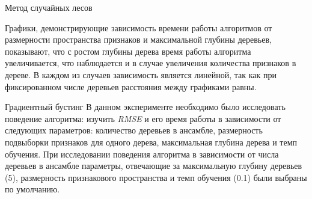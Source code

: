 \documentclass[12pt]{article}
\begin{document}
\begin{section}{Метод случайных лесов}
\newpage

Графики, демонстрирующие зависимость времени работы алгоритмов от размерности пространства признаков и максимальной глубины деревьев, показывают, что с ростом глубины дерева время работы алгоритма увеличивается, что наблюдается и в случае увеличения количества признаков в дереве. В каждом из случаев зависимость является линейной, так как при фиксированном числе деревьев расстояния между графиками равны.
\end{section}
\begin{section}{Градиентный бустинг}
В данном эксперименте необходимо было исследовать поведение алгоритма: изучить \emph{RMSE} и его время работы в зависимости от следующих параметров: количество деревьев в ансамбле, размерность подвыборки признаков для одного дерева, максимальная глубина дерева и темп обучения. При исследовании поведения алгоритма в зависимости от числа деревьев в ансамбле параметры, отвечающие за максимальную глубину деревьев (5), размерность признакового пространства и темп обучения (0.1) были выбраны по умолчанию.


\end{section}
\end{document}
